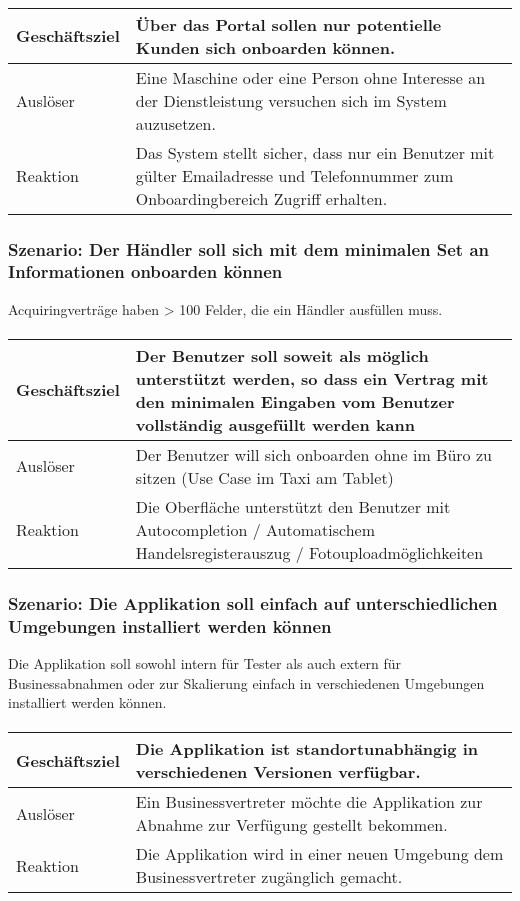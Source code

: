 \paragraph{}
\begin{tabular}{l|l}
\hline
Geschäftsziel & Über das Portal sollen nur potentielle Kunden sich onboarden können. \\ 
\hline
Auslöser & Eine Maschine oder eine Person ohne Interesse an der Dienstleistung versuchen sich im System auzusetzen. \\ 
\hline
Reaktion & Das System stellt sicher, dass nur ein Benutzer mit gülter Emailadresse und Telefonnummer zum Onboardingbereich Zugriff erhalten.
\\ \hline
\end{tabular}

\subsubsection{Szenario: Der Händler soll sich mit dem minimalen Set an Informationen onboarden können}
Acquiringverträge haben > 100 Felder, die ein Händler ausfüllen muss.
\paragraph{}
\begin{tabular}{l|l}
\hline
Geschäftsziel & Der Benutzer soll soweit als möglich unterstützt werden, so dass ein Vertrag mit den minimalen Eingaben vom Benutzer vollständig ausgefüllt werden kann \\
\hline
Auslöser & Der Benutzer will sich onboarden ohne im Büro zu sitzen (Use Case im Taxi am Tablet) \\ 
\hline
Reaktion & Die Oberfläche unterstützt den Benutzer mit Autocompletion / Automatischem Handelsregisterauszug / Fotouploadmöglichkeiten
\\ \hline
\end{tabular}

\subsubsection{Szenario: Die Applikation soll einfach auf unterschiedlichen Umgebungen installiert werden können}
Die Applikation soll sowohl intern für Tester als auch extern für Businessabnahmen oder zur Skalierung einfach in verschiedenen Umgebungen installiert werden können.
\paragraph{}
\begin{tabular}{l|l}
\hline
Geschäftsziel & Die Applikation ist standortunabhängig in verschiedenen Versionen verfügbar. \\
\hline
Auslöser & Ein Businessvertreter möchte die Applikation zur Abnahme zur Verfügung gestellt bekommen. \\ 
\hline
Reaktion & Die Applikation wird in einer neuen Umgebung dem Businessvertreter zugänglich gemacht. 
\\ \hline
\end{tabular}

